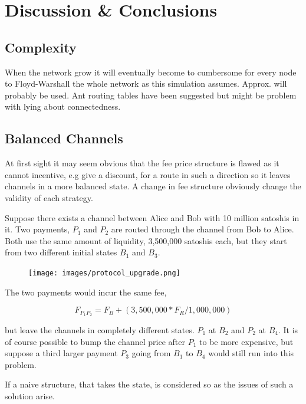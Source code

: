 \chapter{Discussion \& Conclusions}

\section{Complexity}

When the network grow it will eventually become to cumbersome for every node to Floyd-Warshall the whole network as this simulation assumes. Approx. will probably be used. Ant routing tables have been suggested but might be problem with lying about connectedness.

\section{Balanced Channels}

At first sight it may seem obvious that the fee price structure is flawed as it cannot incentive, e.g give a discount, for a route in such a direction so it leaves channels in a more balanced state. A change in fee structure obviously change the validity of each strategy.

Suppose there exists a channel between Alice and Bob with 10 million satoshis in it. 
Two payments, $P_{1}$ and $P_{2}$ are routed through the channel from Bob to Alice.
Both use the same amount of liquidity, 3,500,000 satoshis each, but they start from two different initial states $B_{1}$ and $B_3$.

\begin{figure}[!htb]
	\hspace*{0.7cm} 
	\centering
	\texttt{[image: images/protocol\_upgrade.png]}
	
	\label{fig:upgrade}
	\hspace*{2mm} 	
\end{figure}

The two payments would incur the same fee, 

\[ F_{P_1 P_2} = F_B + (3,500,000 * F_R / 1,000,000) \]

but leave the channels in completely different states. $P_1$ at $B_2$ and $P_2$ at $B_4$. It is of course possible to bump the channel price after $P_1$ to
be more expensive, but suppose a third larger payment $P_3$ going from $B_1$ to $B_4$ would still run into this problem.

If a naive structure, that takes the state, is considered so as the issues of such a solution arise. 

